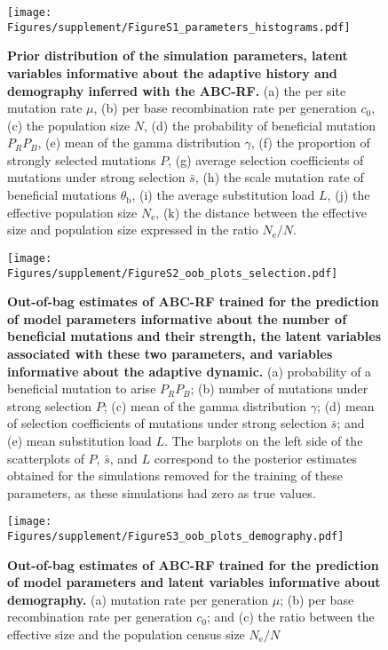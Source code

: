\documentclass[a4paper, 12pt]{article}
\begin{document}
\newpage



\newpage

\begin{figure}[ht]
  \centering
  \texttt{[image: Figures/supplement/FigureS1\_parameters\_histograms.pdf]}
  \small\caption{\textbf{Prior distribution of the simulation parameters, latent variables informative about the adaptive history and demography inferred with the ABC-RF.} (a) the per site mutation rate $\mu$, (b)  per base recombination rate per generation $c_{\mathrm{0}}$, (c) the population size $N$, (d) the probability of beneficial mutation $P_RP_B$, (e) mean of the gamma distribution $\gamma$, (f) the proportion of strongly selected mutations $P$, (g) average selection coefficients of mutations under strong selection $\bar{s}$, (h) the scale mutation rate of beneficial mutations $\theta_{\mathrm{b}}$, (i) the average substitution load $L$, (j) the effective population size $N_{\mathrm{e}}$, (k) the distance between the effective size and population size expressed in the ratio $N_{\mathrm{e}}/N$.}
  \label{fig:supple_pods_priors}
\end{figure}

\begin{figure}[ht]
  \centering
  \texttt{[image: Figures/supplement/FigureS2\_oob\_plots\_selection.pdf]}
  \small\caption{\textbf{Out-of-bag estimates of ABC-RF trained for the prediction of model parameters informative about the number of beneficial mutations and their strength, the latent variables associated with these two parameters, and variables informative about the adaptive dynamic.} (a) probability of a beneficial mutation to arise $P_RP_B$; (b) number of mutations under strong selection $P$; (c)  mean of the gamma distribution $\gamma$; (d) mean of selection coefficients of mutations under strong selection $\bar{s}$; and (e) mean substitution load $L$. The barplots on the left side of the scatterplots of $P$, $\bar{s}$, and $L$ correspond to the posterior estimates obtained for the simulations removed for the training of these parameters, as these simulations had zero as true values.}
  \label{fig:supple_oob_sel}
\end{figure}

\begin{figure}[ht]
  \centering
  \texttt{[image: Figures/supplement/FigureS3\_oob\_plots\_demography.pdf]}
  \small\caption{\textbf{Out-of-bag estimates of ABC-RF trained for the prediction of model parameters and latent variables informative about demography.} (a) mutation rate per generation $\mu$; (b) per base recombination rate per generation $c_{\mathrm{0}}$; and (c) the ratio between the effective size and the population census size $N_{\mathrm{e}}/N$}\label{fig:supple_oob_demo}
\end{figure}
\end{document}
